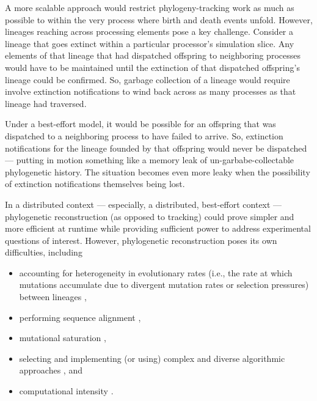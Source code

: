 A more scalable approach would restrict phylogeny-tracking work as much as possible to within the very process where birth and death events unfold.
However, lineages reaching across processing elements pose a key challenge.
Consider a lineage that goes extinct within a particular processor's simulation slice.
Any elements of that lineage that had dispatched offspring to neighboring processes would have to be maintained until the extinction of that dispatched offspring's lineage could be confirmed.
So, garbage collection of a lineage would require involve extinction notifications to wind back across as many processes as that lineage had traversed.

Under a best-effort model, it would be possible for an offspring that was dispatched to a neighboring process to have failed to arrive.
So, extinction notifications for the lineage founded by that offspring would never be dispatched --- putting in motion something like a memory leak of un-garbabe-collectable phylogenetic history.
The situation becomes even more leaky when the possibility of extinction notifications themselves being lost.

In a distributed context --- especially, a distributed, best-effort context ---phylogenetic reconstruction (as opposed to tracking) could prove simpler and more efficient at runtime while providing sufficient power to address experimental questions of interest.
However, phylogenetic reconstruction poses its own difficulties, including
\begin{itemize}
\item accounting for heterogeneity in evolutionary rates (i.e., the rate at which mutations accumulate due to divergent mutation rates or selection pressures) between lineages \citep{lack2010identifying},
\item performing sequence alignment \citep{casci2008lining},
\item mutational saturation \citep{hagstrom2004using},
\item selecting and implementing (or using) complex and diverse algorithmic approaches \citep{kapli2020phylogenetic}, and
\item computational intensity \citep{sarkar2010hardware}.
\end{itemize}

